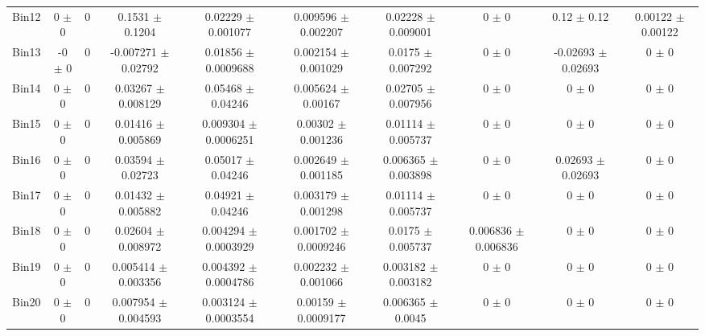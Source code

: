 \begin{tabular}{@{\extracolsep{4pt}}lccccccccc@{}}
     Bin12 & 0 $\pm$ 0 & 0 & 0.1531 $\pm$ 0.1204 & 0.02229 $\pm$ 0.001077 & 0.009596 $\pm$ 0.002207 & 0.02228 $\pm$ 0.009001 & 0 $\pm$ 0 & 0.12 $\pm$ 0.12 & 0.00122 $\pm$ 0.00122 \\ 
     Bin13 & -0 $\pm$ 0 & 0 & -0.007271 $\pm$ 0.02792 & 0.01856 $\pm$ 0.0009688 & 0.002154 $\pm$ 0.001029 & 0.0175 $\pm$ 0.007292 & 0 $\pm$ 0 & -0.02693 $\pm$ 0.02693 & 0 $\pm$ 0 \\ 
     Bin14 & 0 $\pm$ 0 & 0 & 0.03267 $\pm$ 0.008129 & 0.05468 $\pm$ 0.04246 & 0.005624 $\pm$ 0.00167 & 0.02705 $\pm$ 0.007956 & 0 $\pm$ 0 & 0 $\pm$ 0 & 0 $\pm$ 0 \\ 
     Bin15 & 0 $\pm$ 0 & 0 & 0.01416 $\pm$ 0.005869 & 0.009304 $\pm$ 0.0006251 & 0.00302 $\pm$ 0.001236 & 0.01114 $\pm$ 0.005737 & 0 $\pm$ 0 & 0 $\pm$ 0 & 0 $\pm$ 0 \\ 
     Bin16 & 0 $\pm$ 0 & 0 & 0.03594 $\pm$ 0.02723 & 0.05017 $\pm$ 0.04246 & 0.002649 $\pm$ 0.001185 & 0.006365 $\pm$ 0.003898 & 0 $\pm$ 0 & 0.02693 $\pm$ 0.02693 & 0 $\pm$ 0 \\ 
     Bin17 & 0 $\pm$ 0 & 0 & 0.01432 $\pm$ 0.005882 & 0.04921 $\pm$ 0.04246 & 0.003179 $\pm$ 0.001298 & 0.01114 $\pm$ 0.005737 & 0 $\pm$ 0 & 0 $\pm$ 0 & 0 $\pm$ 0 \\ 
     Bin18 & 0 $\pm$ 0 & 0 & 0.02604 $\pm$ 0.008972 & 0.004294 $\pm$ 0.0003929 & 0.001702 $\pm$ 0.0009246 & 0.0175 $\pm$ 0.005737 & 0.006836 $\pm$ 0.006836 & 0 $\pm$ 0 & 0 $\pm$ 0 \\ 
     Bin19 & 0 $\pm$ 0 & 0 & 0.005414 $\pm$ 0.003356 & 0.004392 $\pm$ 0.0004786 & 0.002232 $\pm$ 0.001066 & 0.003182 $\pm$ 0.003182 & 0 $\pm$ 0 & 0 $\pm$ 0 & 0 $\pm$ 0 \\ 
     Bin20 & 0 $\pm$ 0 & 0 & 0.007954 $\pm$ 0.004593 & 0.003124 $\pm$ 0.0003554 & 0.00159 $\pm$ 0.0009177 & 0.006365 $\pm$ 0.0045 & 0 $\pm$ 0 & 0 $\pm$ 0 & 0 $\pm$ 0 \\ 
\hline\hline
  \end{tabular}
